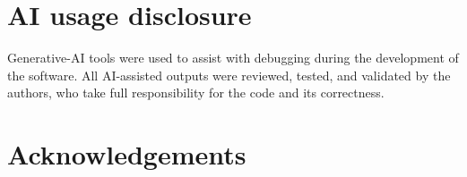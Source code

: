 \documentclass[11pt]{article}
\begin{document}
\section*{AI usage disclosure}

Generative-AI tools were used to assist with debugging during the development of
the software. All AI-assisted outputs were reviewed, tested, and validated by the
authors, who take full responsibility for the code and its correctness.

\section*{Acknowledgements}




\end{document}
